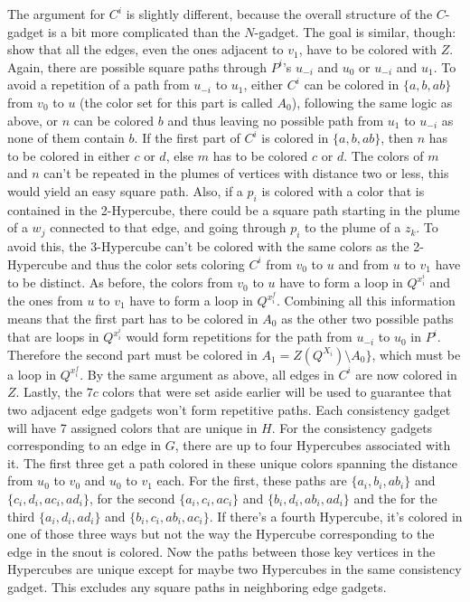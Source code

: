 \documentclass[12pt,a4paper]{article}
\begin{document}
\newline
The argument for $C^i$ is slightly different, because the overall structure of the $C$-gadget is a bit more complicated than the $N$-gadget. The goal is similar, though: show that all the edges, even the ones adjacent to $v_1$, have to be colored with $Z$. Again, there are possible square paths through $P^i$'s $u_{-i}$ and $u_0$ or $u_{-i}$ and $u_1$. To avoid a repetition of a path from $u_{-i}$ to $u_1$, either $C^i$ can be colored in $ \{a, b, ab \}$ from $v_0$ to $u$ (the color set for this part is called $A_0$), following the same logic as above, or $n$ can be colored $b$ and thus leaving no possible path from $u_1$ to $u_{-i}$ as none of them contain $b$. If the first part of $C^i$ is colored in $ \{a, b, ab \}$, then $n$ has to be colored in either $c$ or $d$, else $m$ has to be colored $c$ or $d$. The colors of $m$ and $n$ can't be repeated in the plumes of vertices with distance two or less, this would yield an easy square path. Also, if a $p_i$ is colored with a color that is contained in the 2-Hypercube, there could be a square path starting in the plume of a $w_j$ connected to that edge, and going through $p_i$ to the plume of a $z_k$. To avoid this, the 3-Hypercube can't be colored with the same colors as the 2-Hypercube and thus the color sets coloring $C^i$ from $v_0$ to $u$ and from $u$ to $v_1$ have to be distinct. As before, the colors from $v_0$ to $u$ have to form a loop in $Q^{x^i_i}$ and the ones from $u$ to $v_1$ have to form a loop in $Q^{x^f_i}$. Combining all this information means that the first part has to be colored in $A_0$ as the other two possible paths that are loops in $Q^{x^i_i}$ would form repetitions for the path from $u_{-i}$ to $u_0$ in $P^i$. Therefore the second part must be colored in $A_1 = Z(Q^{X_i}) \setminus A_0 \}$, which must be a loop in $Q^{x^f_i}$. By the same argument as above, all edges in $C^i$ are now colored in $Z$.
\newline
Lastly, the $7c$ colors that were set aside earlier will be used to guarantee that two adjacent edge gadgets won't form repetitive paths. Each consistency gadget will have 7 assigned colors that are unique in $H$. For the consistency gadgets corresponding to an edge in $G$, there are up to four Hypercubes associated with it. The first three get a path colored in these unique colors spanning the distance from $u_0$ to $v_0$ and $u_0$ to $v_1$ each. For the first, these paths are $ \{a_i, b_i, ab_i \}$ and $ \{c_i, d_i, ac_i, ad_i \}$, for the second $ \{a_i, c_i, ac_i \}$ and $ \{b_i, d_i, ab_i, ad_i \}$ and the for the third $ \{a_i, d_i, ad_i \}$ and $ \{b_i, c_i, ab_i, ac_i \}$. If there's a fourth Hypercube, it's colored in one of those three ways but not the way the Hypercube corresponding to the edge in the snout is colored. Now the paths between those key vertices in the Hypercubes are unique except for maybe two Hypercubes in the same consistency gadget. This excludes any square paths in neighboring edge gadgets.
\end{document}
